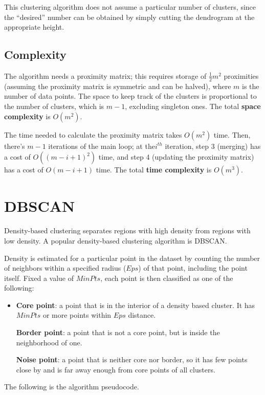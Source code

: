This clustering algorithm does not assume a particular number of clusters, since the ``desired'' number can be obtained by simply cutting the dendrogram at the appropriate height. 

\subsection{Complexity}

The algorithm needs a proximity matrix; this requires storage of $\frac{1}{2} m^2$ proximities (assuming the proximity matrix is symmetric and can be halved), where $m$ is the number of data points. The space to keep track of the clusters is proportional to the number of clusters, which is $m-1$, excluding singleton ones. The total \textbf{space complexity} is $O(m^2)$.

The time needed to calculate the proximity matrix takes $O(m^2)$ time. Then, there's $m-1$ iterations of the main loop; at the$i^{th}$ iteration, step 3 (merging) has a cost of $O((m-i+1)^2)$ time, and step 4 (updating the proximity matrix) has a cost of $O(m-i+1)$ time. The total \textbf{time complexity} is $O(m^3)$.

\section{DBSCAN}

Density-based clustering separates regions with high density from regions with low density. A popular density-based clustering algorithm is DBSCAN.

Density is estimated for a particular point in the dataset by counting the number of neighbors within a specified radius ($Eps$) of that point, including the point itself. Fixed a value of $MinPts$, each point is then classified as one of the following:

\begin{itemize}
    \item \textbf{Core point}: a point that is in the interior of a density based cluster. It has $MinPts$ or more points within $Eps$ distance.

    \textbf{Border point}: a point that is not a core point, but is inside the neighborhood of one.

    \textbf{Noise point}: a point that is neither core nor border, so it has few points close by and is far away enough from core points of all clusters.
\end{itemize}

The following is the algorithm pseudocode.

